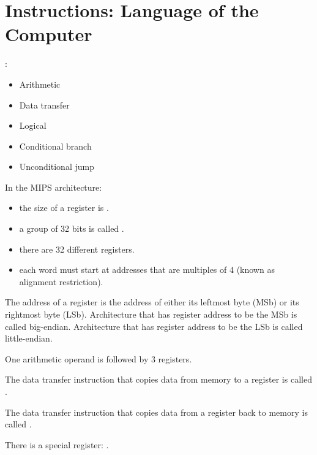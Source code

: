 \chapter{Instructions: Language of the Computer}


  \par {}:
  \begin{itemize}
    \item Arithmetic
    \item Data transfer
    \item Logical
    \item Conditional branch
    \item Unconditional jump
  \end{itemize}

    \par In the MIPS architecture:
    \begin{itemize}
      \item the size of a register is .
      \item a group of 32 bits is called .
      \item there are 32 different registers.
      \item each word must start at addresses that are multiples of 4 (known
        as alignment restriction).
    \end{itemize}
    \par The address of a register is the address of either its leftmost byte
      (MSb) or its rightmost byte (LSb). Architecture that has register address
      to be the MSb is called big-endian. Architecture that has register address
      to be the LSb is called little-endian.
    \par One arithmetic operand is followed by 3 registers.
    \par The data transfer instruction that copies data from memory to a
      register is called .
    \par The data transfer instruction that copies data from a register back
      to memory is called .
    \par There is a special register: .
